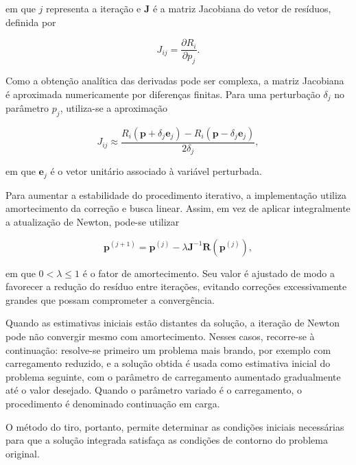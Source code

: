 \documentclass[arial,centeredequations,english,brazilian,oneside,section=TITLE]{ifes8}
\begin{document}
em que $j$ representa a iteração e $\mathbf{J}$ é a matriz
Jacobiana do vetor de resíduos, definida por

\begin{equation}
  J_{ij} =
  \frac{\partial R_i}{\partial p_j}.
  \label{eq:jacobiana}
\end{equation}

Como a obtenção analítica das derivadas pode ser complexa, a matriz
Jacobiana é aproximada numericamente por diferenças finitas. Para
uma perturbação $\delta_j$ no parâmetro $p_j$, utiliza-se a
aproximação

\begin{equation}
  J_{ij}
  \approx
  \frac{
    R_i(\mathbf{p}+\delta_j\mathbf{e}_j)
    -
    R_i(\mathbf{p}-\delta_j\mathbf{e}_j)
  }{2\delta_j},
  \label{eq:jacobiana-diferencas}
\end{equation}

em que $\mathbf{e}_j$ é o vetor unitário associado à variável
perturbada.

Para aumentar a estabilidade do procedimento iterativo, a
implementação utiliza amortecimento da correção e busca linear.
Assim, em vez de aplicar integralmente a atualização de Newton,
pode-se utilizar

\begin{equation}
  \mathbf{p}^{(j+1)}
  =
  \mathbf{p}^{(j)}
  -
  \lambda
  \mathbf{J}^{-1}
  \mathbf{R}\left(\mathbf{p}^{(j)}\right),
  \label{eq:newton-amortecido}
\end{equation}

em que $0 < \lambda \leq 1$ é o fator de amortecimento. Seu valor
é ajustado de modo a favorecer a redução do resíduo entre
iterações, evitando correções excessivamente grandes que possam
comprometer a convergência.

Quando as estimativas iniciais estão distantes da solução, a iteração de Newton pode não
convergir mesmo com amortecimento. Nesses casos, recorre-se à continuação: resolve-se
primeiro um problema mais brando, por exemplo com carregamento reduzido, e a solução
obtida é usada como estimativa inicial do problema seguinte, com o parâmetro de
carregamento aumentado gradualmente até o valor desejado. Quando o parâmetro variado é o
carregamento, o procedimento é denominado continuação em carga.

O método do tiro, portanto, permite determinar as condições
iniciais necessárias para que a solução integrada satisfaça as
condições de contorno do problema original.
\end{document}
